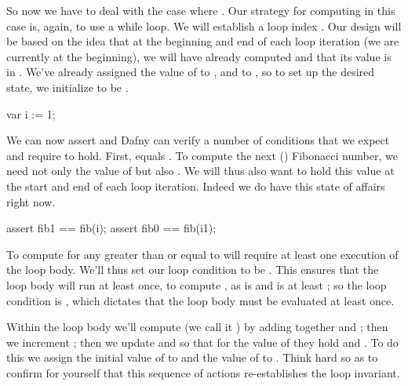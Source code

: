 \documentclass[letterpaper,10pt,english]{sphinxmanual}
\begin{document}
So now we have to deal with the case where . Our strategy for
computing  in this case is, again, to use a while loop. We
will establish a loop index .  Our design will be based on the idea
that at the beginning and end of each loop iteration (we are currently
at the beginning), we will have already computed  and that its
value is in . We’ve already assigned the value of  to
, and  to , so to set up the desired state, we
initialize  to be .

\begin{sphinxVerbatim}[commandchars=\\\{\}]
var i := 1;
\end{sphinxVerbatim}

We can now assert and Dafny can verify a number of conditions that we
expect and require to hold. First,  equals . To compute
the next () Fibonacci number, we need not only the value of
 but also . We will thus also want  to hold
this value at the start and end of each loop iteration. Indeed we do
have this state of affairs right now.

\begin{sphinxVerbatim}[commandchars=\\\{\}]
assert fib1 == fib(i);
assert fib0 == fib(i\PYGZhy{}1);
\end{sphinxVerbatim}

To compute  for any  greater than or equal to  will
require at least one execution of the loop body. We’ll thus set our
loop condition to be . This ensures that the loop body will run
at least once, to compute , as  is  and  is at least
; so the loop condition  is , which dictates that the
loop body must be evaluated at least once.

Within the loop body we’ll compute  (we call it ) by
adding together  and ; then we increment ; then we
update  and  so that for the  value of  they hold
 and . To do this we assign the initial value of
 to  and the value of  to . Think hard so as
to confirm for yourself that this sequence of actions re-establishes
the loop invariant.
\end{document}
